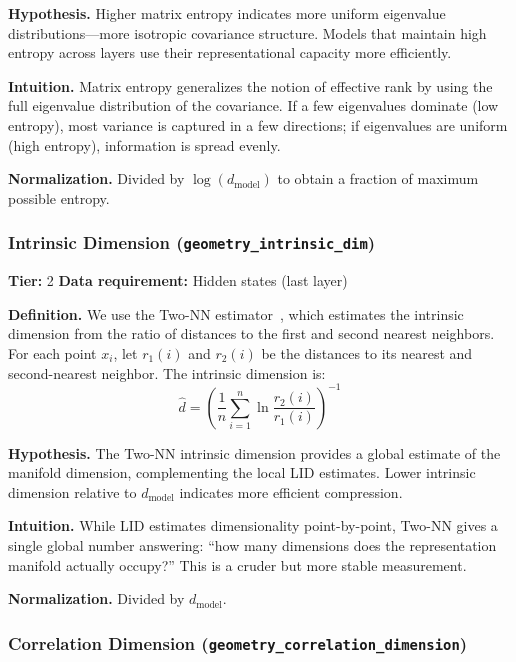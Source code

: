 \documentclass[preprint]{neurips_2025}
\begin{document}
\textbf{Hypothesis.}
Higher matrix entropy indicates more uniform eigenvalue distributions---more isotropic covariance structure. Models that maintain high entropy across layers use their representational capacity more efficiently.

\textbf{Intuition.}
Matrix entropy generalizes the notion of effective rank by using the full eigenvalue distribution of the covariance. If a few eigenvalues dominate (low entropy), most variance is captured in a few directions; if eigenvalues are uniform (high entropy), information is spread evenly.

\textbf{Normalization.} Divided by $\log(d_{\text{model}})$ to obtain a fraction of maximum possible entropy.

\subsubsection{Intrinsic Dimension (\texttt{geometry\_intrinsic\_dim})}
\label{app:intrinsic-dim}

\textbf{Tier:} 2 \quad \textbf{Data requirement:} Hidden states (last layer)

\textbf{Definition.}
We use the Two-NN estimator~\citep{facco2017estimating}, which estimates the intrinsic dimension from the ratio of distances to the first and second nearest neighbors. For each point $x_i$, let $r_1(i)$ and $r_2(i)$ be the distances to its nearest and second-nearest neighbor. The intrinsic dimension is:
\begin{equation}
  \hat{d} = \left(\frac{1}{n} \sum_{i=1}^{n} \ln \frac{r_2(i)}{r_1(i)}\right)^{-1}
\end{equation}

\textbf{Hypothesis.}
The Two-NN intrinsic dimension provides a global estimate of the manifold dimension, complementing the local LID estimates. Lower intrinsic dimension relative to $d_{\text{model}}$ indicates more efficient compression.

\textbf{Intuition.}
While LID estimates dimensionality point-by-point, Two-NN gives a single global number answering: ``how many dimensions does the representation manifold actually occupy?'' This is a cruder but more stable measurement.

\textbf{Normalization.} Divided by $d_{\text{model}}$.

\subsubsection{Correlation Dimension (\texttt{geometry\_correlation\_dimension})}
\label{app:corr-dim}
\end{document}
